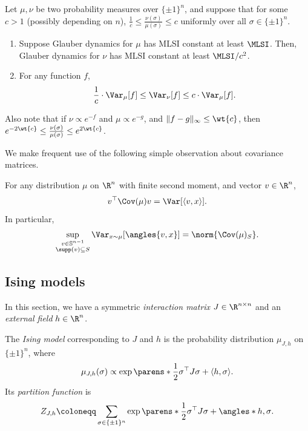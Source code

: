 \documentclass[11pt,letterpaper]{article}
\begin{document}
    \begin{lemma}\label{lem:mlsi-bdd-density-relate}
      Let $\mu,\nu$ be two probability measures over $\{\pm1\}^{n}$, and suppose that for some $c > 1$ (possibly depending on $n$), $\frac{1}{c} \leq \frac{\nu(\sigma)}{\mu(\sigma)} \leq c$ uniformly over all $\sigma \in \{\pm1\}^{n}$.
      \begin{enumerate}
          \item Suppose Glauber dynamics for $\mu$ has MLSI constant at least $\MLSI$. Then, Glauber dynamics for $\nu$ has MLSI constant at least $\MLSI / c^2$.
          \item For any function $f$,
          \[ \frac{1}{c} \cdot \Var_{\mu}[f] \le \Var_{\nu}[f] \le c \cdot \Var_{\mu}[f]. \]
      \end{enumerate}
      Also note that if $\nu \propto e^{-f}$ and $\mu \propto e^{-g}$, and $\|f-g\|_{\infty} \le \wt{c}$, then $e^{-2\wt{c}} \le \frac{\nu(\sigma)}{\mu(\sigma)} \le e^{2\wt{c}}$.
    \end{lemma}

    We make frequent use of the following simple observation about covariance matrices.
    \begin{observation}\label{fact:var-cov}
        For any distribution $\mu$ on $\R^n$ with finite second moment, and vector $v \in \R^n$,
        \[ v^\top \Cov(\mu) v = \Var[\langle v,x\rangle]. \]
        In particular, 
        \[
            \sup_{\substack{v \in \mathbb{S}^{n-1} \\ \supp(v) \subseteq S}} \Var_{x \sim \mu}[\angles{v, x}] = \norm{\Cov(\mu)_S}.
        \]
    \end{observation}


\subsection{Ising models}
    In this section, we have a symmetric \emph{interaction matrix} $J\in\R^{n\times n}$ and an \emph{external field} $h\in\R^n$. 
    \begin{definition}
        The \emph{Ising model} corresponding to $J$ and $h$ is the probability distribution $\mu_{J, h}$ on $\{\pm1\}^n$, where
        \[
            \mu_{J, h}(\sigma) \propto \exp\parens*{\frac{1}{2}\sigma^\top J \sigma + \langle h,\sigma\rangle}.
        \]
        Its \emph{partition function} is
        \[
            Z_{J, h} \coloneqq \sum_{\sigma\in\{\pm1\}^n} \exp\parens*{\frac{1}{2}\sigma^{\top} J\sigma + \angles*{h,\sigma}}.    
        \]
    \end{definition}
\end{document}
